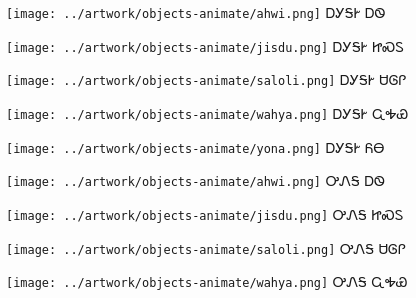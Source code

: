 \documentclass[avery5371]{flashcards}%
\begin{document}
\begin{flashcard}{
\texttt{[image: ../artwork/objects-animate/ahwi.png]}
}\Huge ᎠᎩᎦᎨ ᎠᏫ
\end{flashcard}

\begin{flashcard}{
\texttt{[image: ../artwork/objects-animate/jisdu.png]}
}\Huge ᎠᎩᎦᎨ ᏥᏍᏚ
\end{flashcard}

\begin{flashcard}{
\texttt{[image: ../artwork/objects-animate/saloli.png]}
}\Huge ᎠᎩᎦᎨ ᏌᎶᎵ
\end{flashcard}

\begin{flashcard}{
\texttt{[image: ../artwork/objects-animate/wahya.png]}
}\Huge ᎠᎩᎦᎨ ᏩᎭᏯ
\end{flashcard}

\begin{flashcard}{
\texttt{[image: ../artwork/objects-animate/yona.png]}
}\Huge ᎠᎩᎦᎨ ᏲᎾ
\end{flashcard}

\begin{flashcard}{
\texttt{[image: ../artwork/objects-animate/ahwi.png]}
}\Huge ᎤᏁᎦ ᎠᏫ
\end{flashcard}

\begin{flashcard}{
\texttt{[image: ../artwork/objects-animate/jisdu.png]}
}\Huge ᎤᏁᎦ ᏥᏍᏚ
\end{flashcard}

\begin{flashcard}{
\texttt{[image: ../artwork/objects-animate/saloli.png]}
}\Huge ᎤᏁᎦ ᏌᎶᎵ
\end{flashcard}

\begin{flashcard}{
\texttt{[image: ../artwork/objects-animate/wahya.png]}
}\Huge ᎤᏁᎦ ᏩᎭᏯ
\end{flashcard}
\end{document}
